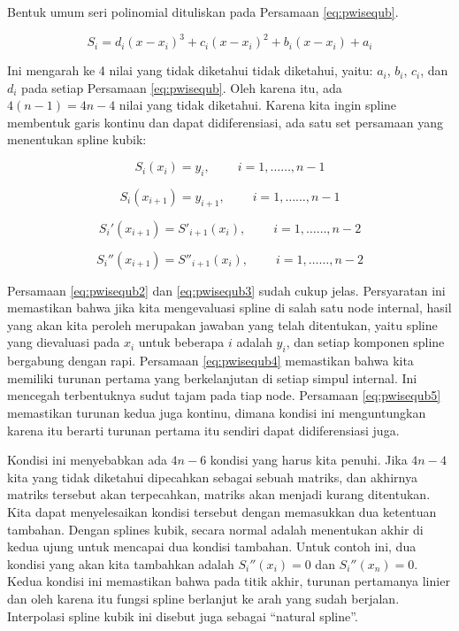 \documentclass[]{book}
\theoremstyle{definition}
\theoremstyle{definition}
\theoremstyle{definition}
\theoremstyle{remark}
\begin{document}
Bentuk umum seri polinomial dituliskan pada Persamaan \eqref{eq:pwisequb}.

\begin{equation}
S_i=d_i\left(x-x_i\right)^3+c_i\left(x-x_i\right)^2+b_i\left(x-x_i\right)+a_i
  \label{eq:pwisequb}
\end{equation}

Ini mengarah ke 4 nilai yang tidak diketahui tidak diketahui, yaitu: \(a_i\), \(b_i\), \(c_i\), dan \(d_i\) pada setiap Persamaan \eqref{eq:pwisequb}. Oleh karena itu, ada \(4 \left(n - 1\right) = 4n - 4\) nilai yang tidak diketahui. Karena kita ingin spline membentuk garis kontinu dan dapat didiferensiasi, ada satu set persamaan yang menentukan spline kubik:

\begin{equation}
S_i\left(x_i\right)=y_i,\ \ \ \ \ \ \ \ \ \ i=1,\dots\dots,n-1
  \label{eq:pwisequb2}
\end{equation}

\begin{equation}
S_i\left(x_{i+1}\right)=y_{i+1},\ \ \ \ \ \ \ \ \ \ i=1,\dots\dots,n-1
  \label{eq:pwisequb3}
\end{equation}

\begin{equation}
S_i'\left(x_{i+1}\right)=S'_{i+1}\left(x_i\right),\ \ \ \ \ \ \ \ \ \ i=1,\dots\dots,n-2
  \label{eq:pwisequb4}
\end{equation}

\begin{equation}
S_i''\left(x_{i+1}\right)=S''_{i+1}\left(x_i\right),\ \ \ \ \ \ \ \ \ \ i=1,\dots\dots,n-2
  \label{eq:pwisequb5}
\end{equation}

Persamaan \eqref{eq:pwisequb2} dan \eqref{eq:pwisequb3} sudah cukup jelas. Persyaratan ini memastikan bahwa jika kita mengevaluasi spline di salah satu node internal, hasil yang akan kita peroleh merupakan jawaban yang telah ditentukan, yaitu spline yang dievaluasi pada \(x_i\) untuk beberapa \(i\) adalah \(y_i\), dan setiap komponen spline bergabung dengan rapi. Persamaan \eqref{eq:pwisequb4} memastikan bahwa kita memiliki turunan pertama yang berkelanjutan di setiap simpul internal. Ini mencegah terbentuknya sudut tajam pada tiap node. Persamaan \eqref{eq:pwisequb5} memastikan turunan kedua juga kontinu, dimana kondisi ini menguntungkan karena itu berarti turunan pertama itu sendiri dapat didiferensiasi juga.

Kondisi ini menyebabkan ada \(4n − 6\) kondisi yang harus kita penuhi. Jika \(4n − 4\) kita yang tidak diketahui dipecahkan sebagai sebuah matriks, dan akhirnya matriks tersebut akan terpecahkan, matriks akan menjadi kurang ditentukan. Kita dapat menyelesaikan kondisi tersebut dengan memasukkan dua ketentuan tambahan. Dengan splines kubik, secara normal adalah menentukan akhir di kedua ujung untuk mencapai dua kondisi tambahan. Untuk contoh ini, dua kondisi yang akan kita tambahkan adalah \(S_i''\left(x_{i}\right)= 0\) dan \(S_i''\left(x_{n}\right)= 0\). Kedua kondisi ini memastikan bahwa pada titik akhir, turunan pertamanya linier dan oleh karena itu fungsi spline berlanjut ke arah yang sudah berjalan. Interpolasi spline kubik ini disebut juga sebagai ``natural spline''.
\end{document}

